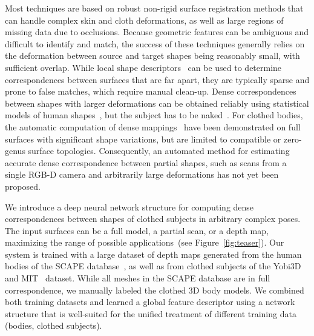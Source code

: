 \documentclass[10pt,twocolumn,letterpaper]{article}
\begin{document}

Most techniques are based on robust non-rigid surface registration methods that can handle complex skin and cloth deformations, as well as large regions of missing data due to occlusions. Because geometric features can be ambiguous and difficult to identify and match, the success of these techniques generally relies on the deformation between source and target shapes being reasonably small, with sufficient overlap. While local shape descriptors~\cite{rusinkiewicz05scan} can be used to determine correspondences between surfaces that are far apart, they are typically sparse and prone to false matches, which require manual clean-up. Dense correspondences between shapes with larger deformations can be obtained reliably using statistical models of human shapes~\cite{Anguelov:2005,Bogo:CVPR:2014}, but the subject has to be naked~\cite{Bogo:ICCV:2015}. For clothed bodies, the automatic computation of dense mappings~\cite{Kim11,Lipman:2009:MVS,Rodola_2014_CVPR,chen15} have been demonstrated on full surfaces with significant shape variations, but are limited to compatible or zero-genus surface topologies. Consequently, an automated method for estimating accurate dense correspondence between partial shapes, such as scans from a single RGB-D camera and arbitrarily large deformations has not yet been proposed.

We introduce a deep neural network structure for computing dense correspondences between shapes of clothed subjects in arbitrary complex poses. The input surfaces can be a full model, a partial scan, or a depth map, maximizing the range of possible applications~(see Figure~\ref{fig:teaser}). Our system is trained with a large dataset of depth maps generated from the human bodies of the SCAPE database~\cite{Anguelov:2005},  as well as from clothed subjects of the Yobi3D~\cite{Yobi3D} and MIT~\cite{Vlasic:2008:AMA} dataset. While all meshes in the SCAPE database are in full correspondence, we manually labeled the clothed 3D body models. We combined both training datasets and learned a global feature descriptor %
using a network structure that is well-suited for the unified treatment of different training data (bodies, clothed subjects).
\end{document}
